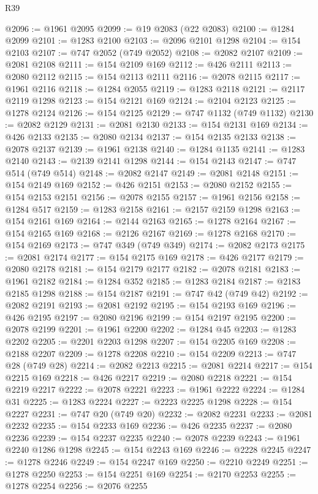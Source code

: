 \begin{lexlean}{R39}
\begin{coremodule}
@2096 := @1961 @2095
@2099 := @19 @2083 (@22 @2083)
@2100 := @1284 @2099
@2101 := @1283 @2100
@2103 := @2096 @2101 @1298
@2104 := @154 @2103
@2107 := @747 @2052 (@749 @2052)
@2108 := @2082 @2107
@2109 := @2081 @2108
@2111 := @154 @2109 @169
@2112 := @426 @2111
@2113 := @2080 @2112
@2115 := @154 @2113 @2111
@2116 := @2078 @2115
@2117 := @1961 @2116
@2118 := @1284 @2055
@2119 := @1283 @2118
@2121 := @2117 @2119 @1298
@2123 := @154 @2121 @169
@2124 := @2104 @2123
@2125 := @1278 @2124
@2126 := @154 @2125
@2129 := @747 @1132 (@749 @1132)
@2130 := @2082 @2129
@2131 := @2081 @2130
@2133 := @154 @2131 @169
@2134 := @426 @2133
@2135 := @2080 @2134
@2137 := @154 @2135 @2133
@2138 := @2078 @2137
@2139 := @1961 @2138
@2140 := @1284 @1135
@2141 := @1283 @2140
@2143 := @2139 @2141 @1298
@2144 := @154 @2143
@2147 := @747 @514 (@749 @514)
@2148 := @2082 @2147
@2149 := @2081 @2148
@2151 := @154 @2149 @169
@2152 := @426 @2151
@2153 := @2080 @2152
@2155 := @154 @2153 @2151
@2156 := @2078 @2155
@2157 := @1961 @2156
@2158 := @1284 @517
@2159 := @1283 @2158
@2161 := @2157 @2159 @1298
@2163 := @154 @2161 @169
@2164 := @2144 @2163
@2165 := @1278 @2164
@2167 := @154 @2165 @169
@2168 := @2126 @2167
@2169 := @1278 @2168
@2170 := @154 @2169
@2173 := @747 @349 (@749 @349)
@2174 := @2082 @2173
@2175 := @2081 @2174
@2177 := @154 @2175 @169
@2178 := @426 @2177
@2179 := @2080 @2178
@2181 := @154 @2179 @2177
@2182 := @2078 @2181
@2183 := @1961 @2182
@2184 := @1284 @352
@2185 := @1283 @2184
@2187 := @2183 @2185 @1298
@2188 := @154 @2187
@2191 := @747 @42 (@749 @42)
@2192 := @2082 @2191
@2193 := @2081 @2192
@2195 := @154 @2193 @169
@2196 := @426 @2195
@2197 := @2080 @2196
@2199 := @154 @2197 @2195
@2200 := @2078 @2199
@2201 := @1961 @2200
@2202 := @1284 @45
@2203 := @1283 @2202
@2205 := @2201 @2203 @1298
@2207 := @154 @2205 @169
@2208 := @2188 @2207
@2209 := @1278 @2208
@2210 := @154 @2209
@2213 := @747 @28 (@749 @28)
@2214 := @2082 @2213
@2215 := @2081 @2214
@2217 := @154 @2215 @169
@2218 := @426 @2217
@2219 := @2080 @2218
@2221 := @154 @2219 @2217
@2222 := @2078 @2221
@2223 := @1961 @2222
@2224 := @1284 @31
@2225 := @1283 @2224
@2227 := @2223 @2225 @1298
@2228 := @154 @2227
@2231 := @747 @20 (@749 @20)
@2232 := @2082 @2231
@2233 := @2081 @2232
@2235 := @154 @2233 @169
@2236 := @426 @2235
@2237 := @2080 @2236
@2239 := @154 @2237 @2235
@2240 := @2078 @2239
@2243 := @1961 @2240 @1286 @1298
@2245 := @154 @2243 @169
@2246 := @2228 @2245
@2247 := @1278 @2246
@2249 := @154 @2247 @169
@2250 := @2210 @2249
@2251 := @1278 @2250
@2253 := @154 @2251 @169
@2254 := @2170 @2253
@2255 := @1278 @2254
@2256 := @2076 @2255

\end{coremodule}
\end{lexlean}
